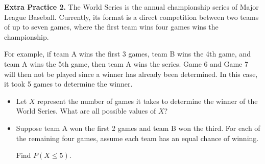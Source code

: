 \documentclass[10pt]{article}
\begin{document}
{\bf\color{blue}Extra Practice 2.}\reversemarginpar{} 
The World Series is the annual championship series of Major League Baseball. Currently, its format is a direct competition between two teams of up to seven games, where the first team wins four games wins the championship.

For example, if team A wins the first 3 games, team B wins the 4th game, and team A wins the 5th game, then team A wins the series. Game 6 and Game 7 will then not be played since a winner has already been determined. In this case, it took 5 games to determine the winner.

    \begin{itemize}
    \item[(a)] Let $X$ represent the number of games it takes to determine the winner of the World Series. What are all possible values of $X$?
    \vfill

    \item[(b)] Suppose team A won the first 2 games and team B won the third. For each of the remaining four games, assume each team has an equal chance of winning. 

    Find $P(X\le 5)$.

    \vfill

    \end{itemize}
\end{document}
